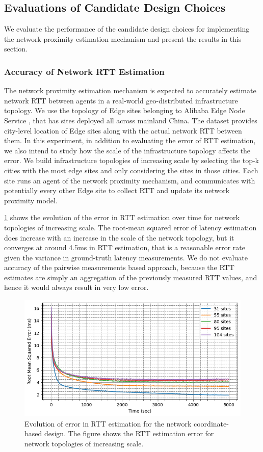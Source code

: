\subsection{Evaluations of Candidate Design Choices} 
We evaluate the performance of the candidate design choices for implementing the network proximity estimation mechanism and present the results in this section.

\subsubsection{Accuracy of Network RTT Estimation}
\label{sec:nw_rtt_error}
The network proximity estimation mechanism is expected to accurately estimate network RTT between agents in a real-world geo-distributed infrastructure topology. We use the topology of Edge sites belonging to Alibaba Edge Node Service \cite{xu2021cloud}, that has sites deployed all across mainland China. The dataset provides city-level location of Edge sites along with the actual network RTT between them. In this experiment, in addition to evaluating the error of RTT estimation, we also intend to study how the scale of the infrastructure topology affects the error. We build infrastructure topologies of increasing scale by selecting the top-k cities with the most edge sites and only considering the sites in those cities. Each site runs an agent of the network proximity mechanism, and communicates with potentially every other Edge site to collect RTT and update its network proximity model.
\par \cref{fig:nw_coord_error} shows the evolution of the error in RTT estimation over time for network topologies of increasing scale. The root-mean squared error of latency estimation does increase with an increase in the scale of the network topology, but it converges at around 4.5ms in RTT estimation, that is a reasonable error rate given the variance in ground-truth latency measurements. We do not evaluate accuracy of the pairwise measurements based approach, because the RTT estimates are simply an aggregation of the previously measured RTT values, and hence it would always result in very low error. \begin{figure}
\centering
\includegraphics[width=0.75\linewidth]{figures/design_space/nw_prox/error.png}
\caption{Evolution of error in RTT estimation for the network coordinate-based design. The figure shows the RTT estimation error for network topologies of increasing scale.}
\label{fig:nw_coord_error}
\end{figure}

